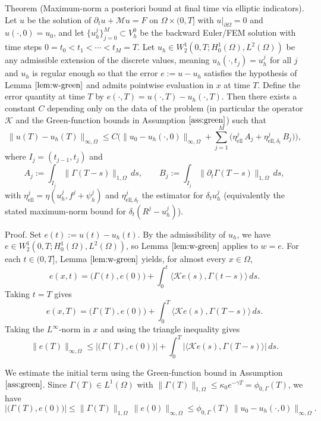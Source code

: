 \documentclass[11pt]{article}
\begin{document}
Theorem (Maximum-norm a posteriori bound at final time via elliptic indicators). Let $u$ be the solution of \(\partial_t u+\mathcal M u=F\) on \(\Omega\times(0,T]\) with \(u|_{\partial\Omega}=0\) and \(u(\cdot,0)=u_0\), and let \(\{u_h^j\}_{j=0}^M\subset V_h^0\) be the backward Euler/FEM solution with time steps \(0=t_0<t_1<\cdots<t_M=T\). Let \(u_h\in W^1_2(0,T;H^1_0(\Omega),L^2(\Omega))\) be any admissible extension of the discrete values, meaning \(u_h(\cdot,t_j)=u_h^j\) for all $j$ and $u_h$ is regular enough so that the error \(e:=u-u_h\) satisfies the hypothesis of Lemma \(\ref{lem:w-green}\) and admits pointwise evaluation in $x$ at time $T$. Define the error quantity at time $T$ by \(e(\cdot,T)=u(\cdot,T)-u_h(\cdot,T)\). Then there exists a constant $C$ depending only on the data of the problem (in particular the operator \(\mathcal K\) and the Green-function bounds in Assumption \(\ref{ass:green}\)) such that
\[
\|u(T)-u_h(T)\|_{\infty,\Omega}\le C\Big(\|u_0-u_h(\cdot,0)\|_{\infty,\Omega}+\sum_{j=1}^M \big( \eta_\mathrm{ell}^j\,A_j+\eta_{\mathrm{ell},\delta_t}^j\,B_j\big)\Big),
\]
where \(I_j=(t_{j-1},t_j)\) and
\[
A_j:=\int_{I_j} \|\Gamma(T-s)\|_{1,\Omega}\,ds,\qquad B_j:=\int_{I_j} \|\partial_t\Gamma(T-s)\|_{1,\Omega}\,ds,
\]
with \(\eta_\mathrm{ell}^j=\eta(u_h^j,f^j+\psi_h^j)\) and \(\eta_{\mathrm{ell},\delta_t}^j\) the estimator for \(\delta_t u_h^j\) (equivalently the stated maximum-norm bound for \(\delta_t(R^j-u_h^j)\)).

\medskip

Proof. Set \(e(t):=u(t)-u_h(t)\). By the admissibility of $u_h$, we have \(e\in W^1_2(0,T;H^1_0(\Omega),L^2(\Omega))\), so Lemma \(\ref{lem:w-green}\) applies to $w=e$. For each \(t\in(0,T]\), Lemma \(\ref{lem:w-green}\) yields, for almost every $x\in\Omega$,
\[
e(x,t)=\big(\Gamma(t),e(0)\big) +\int_0^t \langle\mathcal K e(s),\Gamma(t-s)\rangle\,ds.
\]
Taking \(t=T\) gives
\[
e(x,T)=\big(\Gamma(T),e(0)\big)+\int_0^T \langle\mathcal K e(s),\Gamma(T-s)\rangle\,ds.
\]
Taking the $L^\infty$-norm in $x$ and using the triangle inequality gives
\[
\|e(T)\|_{\infty,\Omega}\le \big|\big(\Gamma(T),e(0)\big)\big|+\int_0^T \big|\langle\mathcal K e(s),\Gamma(T-s)\rangle\big|\,ds.
\]

We estimate the initial term using the Green-function bound in Assumption \(\ref{ass:green}\). Since \(\Gamma(T)\in L^1(\Omega)\) with \(\|\Gamma(T)\|_{1,\Omega}\le \kappa_0e^{-\gamma T}=\phi_{0,\Gamma}(T)\), we have
\[
\big|\big(\Gamma(T),e(0)\big)\big|\le \|\Gamma(T)\|_{1,\Omega}\,\|e(0)\|_{\infty,\Omega}\le \phi_{0,\Gamma}(T)\,\|u_0-u_h(\cdot,0)\|_{\infty,\Omega}.
\]
\end{document}
